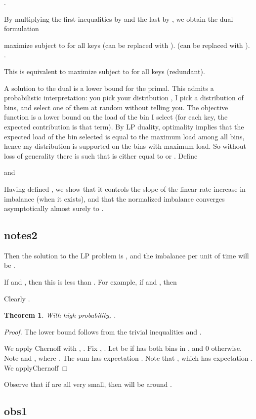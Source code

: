\documentclass[10pt,conference,letterpaper]{IEEEtran}
\newcommand{\mycomment}[1]{}
\newtheorem{theorem}{Theorem}[section]
\begin{document}
{           .

By multiplying the first inequalities by  and the last by , we obtain the dual formulation

maximize 
subject to
         for all keys  (can be replaced with ).
         (can be replaced with ).
        .

This is equivalent to
maximize 
subject to
         for all keys 
         (redundant).

A solution to the dual is a lower bound for the primal. This admits a probabilistic interpretation: you pick your distribution , I pick a
distribution of bins, and select one of them at random without telling you. The objective function is a lower bound on the load of the bin I select
(for each key, the expected contribution is that term). By LP duality, optimality implies that the expected load of the bin selected is equal to the
maximum load among all bins, hence my distribution is supported on the bins with maximum load. So without loss of generality there is  such that  is either equal to  or .
Define

and



Having defined , we show that it controls the slope of the linear-rate increase in imbalance (when it exists),
       and that  the normalized imbalance converges asymptotically almost surely to .




\subsection{notes2}
Then the solution to the LP problem is , and the imbalance per unit of time will be .

If  and , then this is less than .
For example, if  and , then




Clearly .
\begin{theorem}
With high probability, .
\end{theorem}
\begin{proof}
The lower bound follows from the trivial inequalities  and .

We apply Chernoff with , .
Fix , . Let  be  if  has both bins in , and 0 otherwise. Note 
and , where .
The sum has expectation .
Note that , which has expectation .
We applyChernoff

\end{proof}
Observe that if  are all very small, then
 will be around .
\subsection{obs1}
\mycomment{
It is well known that with one choice, the imbalance grows as .

}}
\end{document}
